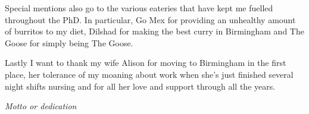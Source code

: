 Special mentions also go to the various eateries that have kept me fuelled throughout the PhD. In particular, Go Mex for providing an unhealthy amount of burritos to my diet, Dilshad for making the best curry in Birmingham and The Goose for simply being The Goose.

Lastly I want to thank my wife Alison for moving to Birmingham in the first place, her tolerance of my moaning about work when she's just finished several night shifts nursing and for all her love and support through all the years. 
%
\cleardoublepage
~
\vspace*{\fill}
\begin{center}
  \emph{Motto or dedication}
\end{center}
\vspace*{\fill}
\cleardoublepage
